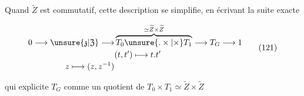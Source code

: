 Quand $\widetilde Z$ est commutatif,  cette description se simplifie, en écrivant la suite exacte

\[\begin{aligned}
0\longrightarrow\unsure{\mathfrak{z}|\mathfrak{Z}}\longrightarrow
&\overbrace{T_0\unsure{\mathbin{.}\times|\times}T_1}^{\simeq\widetilde Z\times\widetilde Z}\longrightarrow T_G\longrightarrow1\\
&(t,t')\longmapsto t.t'\\[-2pt]
z\longmapsto (z,z^{-1})&
\end{aligned}\tag*{(121)}\]

qui explicite $T_G$ comme un quotient de $T_0\times T_1\simeq\widetilde Z\times\widetilde Z$

